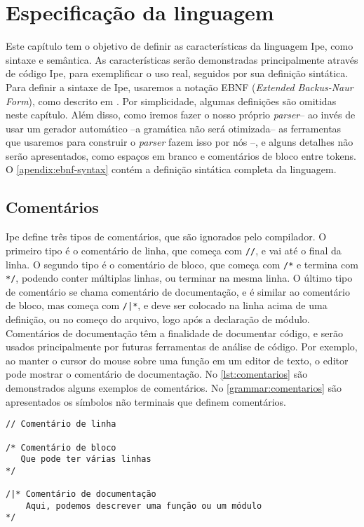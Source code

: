 
\chapter{Especificação da linguagem}\label{chapter:specification}

Este capítulo tem o objetivo de definir as características da linguagem Ipe, como
sintaxe e semântica. As características serão demonstradas principalmente através
de código Ipe, para exemplificar o uso real, seguidos por sua definição sintática.
Para definir a sintaxe de Ipe, usaremos a notação EBNF (\textit{Extended Backus-Naur Form}),
como descrito em \cite{ebnfstandard}. Por simplicidade, algumas definições são
omitidas neste capítulo. Além disso, como iremos fazer o nosso próprio
\textit{parser}-- ao invés de usar um gerador automático --a gramática não será
otimizada-- as ferramentas que usaremos para construir o \textit{parser} fazem
isso por nós --, e alguns detalhes não serão apresentados, como espaços em branco
e comentários de bloco entre tokens. O \autoref{apendix:ebnf-syntax} contém a
definição sintática completa da linguagem.

\section{Comentários}

Ipe define três tipos de comentários, que são ignorados pelo compilador. O primeiro
tipo é o comentário de linha, que começa com \texttt{//}, e vai até o final da linha.
O segundo tipo é o comentário de bloco, que começa com \texttt{/*} e termina com
\texttt{*/}, podendo conter múltiplas linhas, ou terminar na mesma linha. O último
tipo de comentário se chama comentário de documentação, e é similar ao comentário
de bloco, mas começa com \texttt{/|*}, e deve ser colocado na linha acima de uma
definição, ou no começo do arquivo, logo após a declaração de módulo. Comentários
de documentação têm a finalidade de documentar código, e serão usados principalmente por
futuras ferramentas de análise de código. Por exemplo, ao manter o cursor do
mouse sobre uma função em um editor de texto, o editor pode mostrar o comentário
de documentação. No \autoref{lst:comentarios} são demonstrados alguns exemplos
de comentários. No \autoref{grammar:comentarios} são apresentados os símbolos
não terminais que definem comentários.

\begin{lstlisting}[label={lst:comentarios},caption={Exemplos de comentários}]
// Comentário de linha

/* Comentário de bloco
   Que pode ter várias linhas
*/

/|* Comentário de documentação
    Aqui, podemos descrever uma função ou um módulo 
*/
\end{lstlisting}

